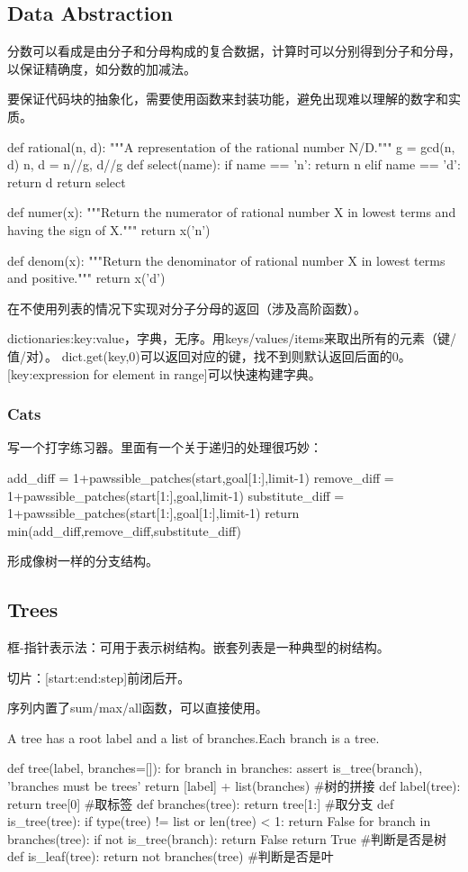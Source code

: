 \documentclass{ctexart}
\begin{document}
\subsection{Data Abstraction}

分数可以看成是由分子和分母构成的复合数据，计算时可以分别得到分子和分母，以保证精确度，如分数的加减法。

要保证代码块的抽象化，需要使用函数来封装功能，避免出现难以理解的数字和实质。
\begin{python}
    def rational(n, d):
    """A representation of the rational number N/D."""
    g = gcd(n, d)
    n, d = n//g, d//g
    def select(name):
        if name == 'n':
            return n
        elif name == 'd':
            return d
    return select

def numer(x):
    """Return the numerator of rational number X in lowest terms and having
    the sign of X."""
    return x('n')

def denom(x):
    """Return the denominator of rational number X in lowest terms and positive."""
    return x('d')
\end{python}
在不使用列表的情况下实现对分子分母的返回（涉及高阶函数）。

dictionaries:{key:value}，字典，无序。用keys/values/items来取出所有的元素（键/值/对）。
dict.get(key,0)可以返回对应的键，找不到则默认返回后面的0。
[key:expression for element in range]可以快速构建字典。

\subsubsection{Cats}

写一个打字练习器。里面有一个关于递归的处理很巧妙：
\begin{python}
        add_diff = 1+pawssible_patches(start,goal[1:],limit-1)
        remove_diff = 1+pawssible_patches(start[1:],goal,limit-1)
        substitute_diff = 1+pawssible_patches(start[1:],goal[1:],limit-1)
        return min(add_diff,remove_diff,substitute_diff)
\end{python}
形成像树一样的分支结构。

\subsection{Trees}

框-指针表示法：可用于表示树结构。嵌套列表是一种典型的树结构。

切片：[start:end:step]前闭后开。

序列内置了sum/max/all函数，可以直接使用。

A tree has a root label and a list of branches.Each branch is a tree. 
\begin{python}
def tree(label, branches=[]):
    for branch in branches:
        assert is_tree(branch), 'branches must be trees'
    return [label] + list(branches)
#树的拼接
def label(tree):
    return tree[0]
#取标签
def branches(tree):
    return tree[1:]
#取分支
def is_tree(tree):
    if type(tree) != list or len(tree) < 1:
        return False
    for branch in branches(tree):
        if not is_tree(branch):
            return False
    return True
#判断是否是树
def is_leaf(tree):
    return not branches(tree)
#判断是否是叶
\end{python}
\end{document}
